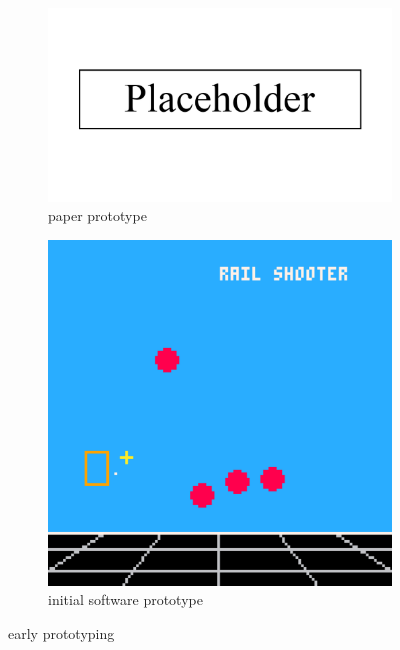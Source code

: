 \documentclass[11pt]{article}
\begin{document}
\begin{figure}[h]
\begin{subfigure}{.5\textwidth}
  \centering
  \includegraphics[width=.8\linewidth]{placeholder}
  \caption{paper prototype}
  \label{fig:pfig1}
\end{subfigure}
\begin{subfigure}{.5\textwidth}
  \centering
  \includegraphics[width=.8\linewidth]{prototype2d}
  \caption{initial software prototype}
  \label{fig:pfig2}
\end{subfigure}
\caption{early prototyping}
\label{fig:gameprototype}
\end{figure}

\end{document}
